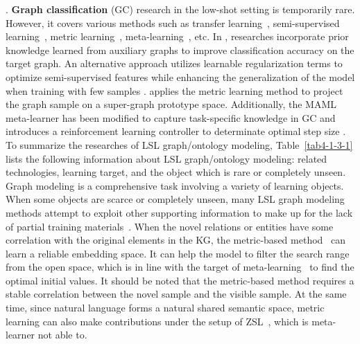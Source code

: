 \uppercase\expandafter{}. \textbf{Graph classification} (GC) research in the low-shot setting is temporarily rare. However, it covers various methods such as transfer learning~, semi-supervised learning~, metric learning~, meta-learning~, etc. In , researches incorporate prior knowledge learned from auxiliary graphs to improve classification accuracy on the target graph. An alternative approach utilizes learnable regularization terms to  optimize semi-supervised features while enhancing the generalization of the model when training with few samples .  applies the metric learning method to project the graph sample on a super-graph prototype space. Additionally, the MAML meta-learner has been modified to capture task-specific knowledge in GC and introduces a reinforcement learning controller to determinate optimal step size .
To summarize the researches of LSL graph/ontology modeling, Table~\ref{tab4-1-3-1} lists the following information about LSL graph/ontology modeling: related technologies, learning target, and the object which is rare or completely unseen. Graph modeling is a comprehensive task involving a variety of learning objects. When some objects are scarce or completely unseen, many LSL graph modeling methods attempt to exploit other supporting information to make up for the lack of partial training materials~. When the novel relations or entities have some correlation with the original elements in the KG, the metric-based method~ can learn a reliable embedding space. It can help the model to filter the search range from the open space, which is in line with the target of meta-learning~ to find the optimal initial values. It should be noted that the metric-based method requires a stable correlation between the novel sample and the visible sample. At the same time, since natural language forms a natural shared semantic space, metric learning can also make contributions under the setup of ZSL~, which is meta-learner not able to.

